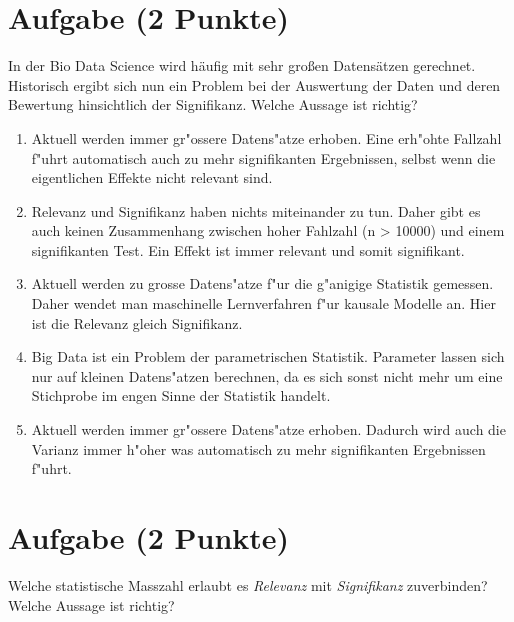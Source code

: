 \documentclass[a4paper, 10pt]{scrartcl}\usepackage[]{graphicx}\usepackage[]{xcolor}
\begin{document}
\section{Aufgabe \hfill (2 Punkte)}

In der Bio Data Science wird h{\"a}ufig mit sehr gro{\ss}en Datens{\"a}tzen
gerechnet. Historisch ergibt sich nun ein Problem bei der Auswertung der
Daten und deren Bewertung hinsichtlich der Signifikanz. Welche Aussage ist richtig?



\begin{enumerate}
\item [\textbf{A} \msquare] Aktuell werden immer gr{"o}ssere Datens{"a}tze erhoben. Eine erh{"o}hte Fallzahl f{"u}hrt automatisch auch zu mehr signifikanten Ergebnissen, selbst wenn die eigentlichen Effekte nicht relevant sind.
\item [\textbf{B} \msquare] Relevanz und Signifikanz haben nichts miteinander zu tun. Daher gibt es auch keinen Zusammenhang zwischen hoher Fahlzahl (n > 10000) und einem signifikanten Test. Ein Effekt ist immer relevant und somit signifikant.
\item [\textbf{C} \msquare] Aktuell werden zu grosse Datens{"a}tze f{"u}r die g{"a}nigige Statistik gemessen. Daher wendet man maschinelle Lernverfahren f{"u}r kausale Modelle an. Hier ist die Relevanz gleich Signifikanz.
\item [\textbf{D} \msquare] Big Data ist ein Problem der parametrischen Statistik. Parameter lassen sich nur auf kleinen Datens{"a}tzen berechnen, da es sich sonst nicht mehr um eine Stichprobe im engen Sinne der Statistik handelt.
\item [\textbf{E} \msquare] Aktuell werden immer gr{"o}ssere Datens{"a}tze erhoben. Dadurch wird auch die Varianz immer h{"o}her was automatisch zu mehr signifikanten Ergebnissen f{"u}hrt.
\end{enumerate}

\section{Aufgabe \hfill (2 Punkte)}

Welche statistische Masszahl erlaubt es \textit{Relevanz} mit
\textit{Signifikanz} zuverbinden? Welche Aussage ist richtig?
\end{document}
